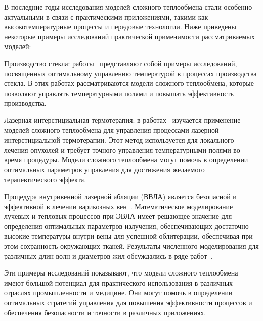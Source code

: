 В последние годы исследования моделей сложного теплообмена стали особенно
актуальными в связи с практическими приложениями, такими
как высокотемпературные процессы и передовые технологии.
Ниже приведены некоторые примеры исследований практической применимости рассматриваемых моделей:

Производство стекла: работы~\cite{frank2010optimal, clever2012optimal} представляют
собой примеры исследований, посвященных оптимальному
управлению температурой в процессах производства стекла.
В этих работах рассматриваются модели сложного теплообмена, которые позволяют управлять
температурными полями и повышать эффективность производства.

Лазерная интерстициальная термотерапия: в работах~\cite{Tse2012, Hubner2017}
изучается применение моделей сложного теплообмена для
управления процессами лазерной интерстициальной термотерапии.
Этот метод используется для локального лечения опухолей и
требует точного управления температурными полями во время процедуры.
Модели сложного теплообмена могут помочь в определении оптимальных
параметров управления для достижения желаемого терапевтического эффекта.

Процедура внутривенной лазерной абляции (ВВЛА) является безопасной и эффективной
в лечении варикозных вен~\cite{Endovenous_vandenBos2009}.
Математическое моделирование лучевых и тепловых процессов при ЭВЛА
имеет решающее значение для определения оптимальных параметров
излучения, обеспечивающих достаточно высокие
температуры внутри вены для успешной облитерации,
обеспечивая при этом сохранность окружающих тканей.
Результаты численного моделирования для различных
длин волн и диаметров жил обсуждались в ряде работ~\cite{
    Opticalthermal_vanRuijven2014, Some_Poluektova2014,
    Endovenous_Malskat2014, Mathematical_Mordon2006,
}.


Эти примеры исследований показывают, что модели сложного теплообмена имеют
большой потенциал для практического использования в различных отраслях промышленности и медицине.
Они могут помочь в определении оптимальных стратегий
управления для повышения эффективности процессов
и обеспечения безопасности и точности в различных приложениях.

%


